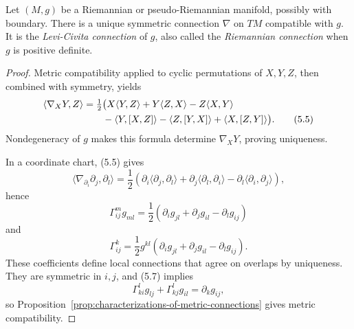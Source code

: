 \begin{theorem}
\label{thm:fundamental-theorem-riemannian-geometry}

Let $(M,g)$ be a Riemannian or pseudo-Riemannian manifold, possibly with
boundary. There is a unique symmetric connection $\nabla$ on $TM$ compatible
with $g$. It is the \emph{Levi-Civita connection} of $g$, also called the
\emph{Riemannian connection} when $g$ is positive definite.

\begin{proof}
\sketch Metric compatibility applied to cyclic permutations of $X,Y,Z$, then
combined with symmetry, yields
\begin{align}
\langle\nabla_XY,Z\rangle
&=\tfrac12\bigl(X\langle Y,Z\rangle+Y\langle Z,X\rangle-Z\langle X,Y\rangle
\notag\\
&\qquad-\langle Y,[X,Z]\rangle-\langle Z,[Y,X]\rangle
+\langle X,[Z,Y]\rangle\bigr).
\tag{5.5}
\end{align}
Nondegeneracy of $g$ makes this formula determine $\nabla_XY$, proving
uniqueness.

In a coordinate chart, (5.5) gives
\begin{equation}
\langle\nabla_{\partial_i}\partial_j,\partial_l\rangle
=\frac12(\partial_i\langle\partial_j,\partial_l\rangle
+\partial_j\langle\partial_l,\partial_i\rangle
-\partial_l\langle\partial_i,\partial_j\rangle),
\tag{5.6}
\end{equation}
hence
\begin{equation}
\Gamma^m_{ij}g_{ml}
=\frac12(\partial_ig_{jl}+\partial_jg_{il}-\partial_lg_{ij})
\tag{5.7}
\end{equation}
and
\begin{equation}
\Gamma^k_{ij}
=\frac12g^{kl}(\partial_ig_{jl}+\partial_jg_{il}-\partial_lg_{ij}).
\tag{5.8}
\end{equation}
These coefficients define local connections that agree on overlaps by
uniqueness. They are symmetric in $i,j$, and (5.7) implies
\[
\Gamma^l_{ki}g_{lj}+\Gamma^l_{kj}g_{il}=\partial_kg_{ij},
\]
so Proposition~\ref{prop:characterizations-of-metric-connections} gives metric
compatibility.
\end{proof}
\end{theorem}

